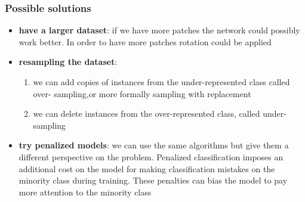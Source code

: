 \documentclass{beamer}
\begin{document}
\begin{frame}
\frametitle{Possible solutions}
\begin{itemize}

	\item \textbf{have a larger dataset}: if we have more patches the network could possibly work 			          better. In order to have more patches rotation could be applied
	
	\item \textbf{resampling the dataset}: 
   \begin{enumerate}
   
		\item we can add copies of instances from the under-represented class called over-		              sampling,or more formally sampling with replacement
		\item we can delete instances from the over-represented class, called under-sampling
   
   \end{enumerate}
   
   \item \textbf{try penalized models}: we can use the same algorithms but give them a different perspective on the problem. 
Penalized classification imposes an additional cost on the model for making classification mistakes on the minority class during training. These penalties can bias the model to pay more attention to the minority class 
\end{itemize}
\end{frame}
\end{document}
